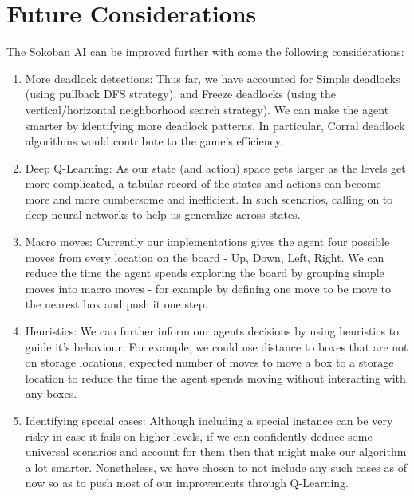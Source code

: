 \documentclass{article}
\begin{document}
\section{Future Considerations}
The Sokoban AI can be improved further with some the following considerations:
\begin{enumerate}
    \item More deadlock detections: Thus far, we have accounted for Simple deadlocks (using pullback DFS strategy), and Freeze deadlocks (using the vertical/horizontal neighborhood search strategy). We can make the agent smarter by identifying more deadlock patterns. In particular, Corral deadlock algorithms would contribute to the game's efficiency.
    \item Deep Q-Learning: As our state (and action) space gets larger as the levels get more complicated, a tabular record of the states and actions can become more and more cumbersome and inefficient. In such scenarios, calling on to deep neural networks to help us generalize across states.
    \item Macro moves: Currently our implementations gives the agent four possible moves from every location on the board - Up, Down, Left, Right. We can reduce the time the agent spends exploring the board by grouping simple moves into macro moves - for example by defining one move to be move to the nearest box and push it one step. 
    \item Heuristics: We can further inform our agents decisions by using heuristics to guide it's behaviour. For example, we could use distance to boxes that are not on storage locations, expected number of moves to move a box to a storage location to reduce the time the agent spends moving without interacting with any boxes. 
    \item Identifying special cases: Although including a special instance can be very risky in case it fails on higher levels, if we can confidently deduce some universal scenarios and account for them then that might make our algorithm a lot smarter. Nonetheless, we have chosen to not include any such cases as of now so as to push most of our improvements through Q-Learning. 
\end{enumerate}

\end{document}
